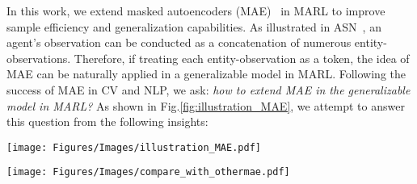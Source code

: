 In this work, we extend masked autoencoders (MAE)~\cite{he2022masked} in MARL to improve sample efficiency and generalization capabilities. As illustrated in ASN~\cite{wang2019action}, an agent's observation can be conducted as a concatenation of numerous entity-observations. Therefore, if treating each entity-observation as a token, the idea of MAE can be naturally applied in a generalizable model in MARL. Following the success of MAE in CV and NLP, we ask: \textit{how to extend MAE in the generalizable model in MARL?} As shown in Fig.\ref{fig:illustration_MAE}, we attempt to answer this question from the following insights:
\begin{figure*}[t]
    \centering
    \texttt{[image: Figures/Images/illustration\_MAE.pdf]}
    \caption{Illustration of MAE in different domains. (a) Masked autoencoding in NLP. (b) Masked autoencoding in CV. (c) Masked autoencoding in the context of generalization in MARL.
}\label{fig:illustration_MAE}
\end{figure*}
\begin{figure*}[]
    \centering
    \texttt{[image: Figures/Images/compare\_with\_othermae.pdf]}
    \caption{Simplified schematic diagram of typical methods for applying MAE in multi-agent systems (MA2CL, MaskMA and MA2RL). The figure shows a comparison of masking between MA2CL, MaskMA, and MA2RL. (a) random masking in MA2CL. (b) random masking in MaskMA. (c) dynamic masking in MA2RL}
\label{fig:simple_compare_mae}
\end{figure*}
